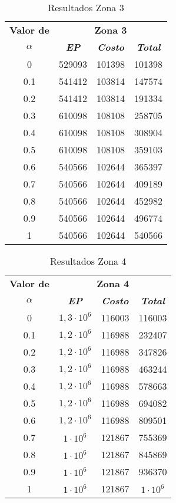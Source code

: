 \documentclass[conference]{IEEEtran}
\begin{document}
\begin{table}[H]
\caption{Resultados Zona 3}
\begin{center}
\begin{tabular}{|c|c|c|c|}
\hline
\textbf{Valor de}&\multicolumn{3}{|c|}{\textbf{Zona 3}} \\
\cline{2-4} 
\textbf{$\alpha$} & \textbf{\textit{EP}}& \textbf{\textit{Costo}}& \textbf{\textit{Total}} \\
\hline
0&529093&101398&101398\\ \hline
0.1&541412&103814&147574\\ \hline
0.2&541412&103814&191334\\ \hline
0.3&610098&108108&258705\\ \hline
0.4&610098&108108&308904\\ \hline
0.5&610098&108108&359103\\ \hline
0.6&540566&102644&365397\\ \hline
0.7&540566&102644&409189\\ \hline
0.8&540566&102644&452982\\ \hline
0.9&540566&102644&496774\\ \hline
1&540566&102644&540566\\ \hline
\end{tabular}
\label{tab1}
\end{center}
\end{table}

\begin{table}[H]
\caption{Resultados Zona 4}
\begin{center}
\begin{tabular}{|c|c|c|c|}
\hline
\textbf{Valor de}&\multicolumn{3}{|c|}{\textbf{Zona 4}} \\
\cline{2-4} 
\textbf{$\alpha$} & \textbf{\textit{EP}}& \textbf{\textit{Costo}}& \textbf{\textit{Total}} \\
\hline
0&$1,3\cdot 10^6$&116003&116003\\ \hline
0.1&$1,2\cdot10^6$&116988&232407\\ \hline
0.2&$1,2\cdot10^6$&116988&347826\\ \hline
0.3&$1,2\cdot10^6$&116988&463244\\ \hline
0.4&$1,2\cdot10^6$&116988&578663\\ \hline
0.5&$1,2\cdot10^6$&116988&694082\\ \hline
0.6&$1,2\cdot10^6$&116988&809501\\ \hline
0.7&$1\cdot10^6$&121867&755369\\ \hline
0.8&$1\cdot10^6$&121867&845869\\ \hline
0.9&$1\cdot10^6$&121867&936370\\ \hline
1&$1\cdot10^6$&121867&$1\cdot10^6$\\ \hline
\end{tabular}
\label{tab1}
\end{center}
\end{table}
\end{document}
